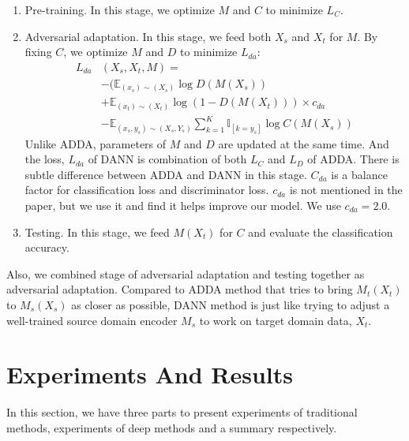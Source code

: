 \documentclass[conference]{IEEEtran}
\begin{document}
\begin{enumerate}
  \item Pre-training. In this stage, we optimize $M$ and $C$ to minimize $L_{C}$.
  \item Adversarial adaptation. In this stage, we feed both $X_s$ and $X_t$ for $M$. By fixing $C$, we optimize $M$ and $D$ to minimize $L_{da}$:
      \begin{equation}\label{dann_da}
        \begin{aligned}
        L_{da} & (X_{s}, X_{t}, M) =  \\
                            &-(\mathbb{E}_{(x_s) \sim (X_s)} \log D(M(X_{s})) \\
                            &+\mathbb{E}_{(x_t) \sim (X_t)} \log (1 - D(M(X_{t}))) \times c_{da} \\
                            &-\mathbb{E}_{(x_s,y_s) \sim (X_s,Y_s)}
                            \sum\limits_{k=1}^{K} \mathbb{I}_{[k=y_s]} \log C(M(X_{s}))
        \end{aligned}
      \end{equation}
      Unlike ADDA, parameters of $M$ and $D$ are updated at the same time. And the loss, $L_{da}$ of DANN is combination of both $L_C$ and $L_D$ of ADDA. There is subtle difference between ADDA and DANN in this stage. $C_{da}$ is a balance factor for classification loss and discriminator loss. $c_{da}$ is not mentioned in the paper, but we use it and find it helps improve our model. We use $c_{da}=2.0$.
  \item Testing. In this stage, we feed $M(X_t)$ for $C$ and evaluate the classification accuracy.
\end{enumerate}
Also, we combined stage of adversarial adaptation and testing together as adversarial adaptation. Compared to ADDA method that tries to bring $M_t(X_t)$ to $M_s(X_s)$ as closer as possible, DANN method is just like trying to adjust a well-trained source domain encoder $M_s$ to work on target domain data, $X_t$.

\section{Experiments And Results}
In this section, we have three parts to present experiments of traditional methods, experiments of deep methods and a summary respectively.
\end{document}
